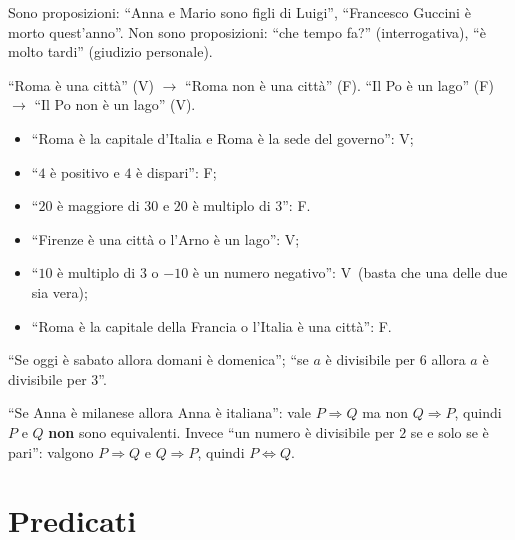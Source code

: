 \documentclass[11pt,a4paper]{article}
\newcommand{\V}{\textsf{V}}
\newcommand{\F}{\textsf{F}}
\begin{document}
\begin{esempio}
Sono proposizioni: ``Anna e Mario sono figli di Luigi'', ``Francesco Guccini è morto quest'anno''. Non sono proposizioni: ``che tempo fa?'' (interrogativa), ``è molto tardi'' (giudizio personale).
\end{esempio}

\begin{esempio}[Negazione]
``Roma è una città'' (\V) $\to$ ``Roma non è una città'' (\F).
``Il Po è un lago'' (\F) $\to$ ``Il Po non è un lago'' (\V).
\end{esempio}

\begin{esempio}[Congiunzione]
\begin{itemize}
    \item ``Roma è la capitale d'Italia e Roma è la sede del governo'': \V;
    \item ``$4$ è positivo e $4$ è dispari'': \F;
    \item ``$20$ è maggiore di $30$ e $20$ è multiplo di $3$'': \F.
\end{itemize}
\end{esempio}

\begin{esempio}[Disgiunzione]
\begin{itemize}
    \item ``Firenze è una città o l'Arno è un lago'': \V;
    \item ``$10$ è multiplo di $3$ o $-10$ è un numero negativo'': \V\ (basta che una delle due sia vera);
    \item ``Roma è la capitale della Francia o l'Italia è una città'': \F.
\end{itemize}
\end{esempio}

\begin{esempio}
``Se oggi è sabato allora domani è domenica''; ``se $a$ è divisibile per $6$ allora $a$ è divisibile per $3$''.

``Se Anna è milanese allora Anna è italiana'': vale $P \Rightarrow Q$ ma non $Q \Rightarrow P$, quindi $P$ e $Q$ \textbf{non} sono equivalenti. Invece ``un numero è divisibile per $2$ se e solo se è pari'': valgono $P \Rightarrow Q$ e $Q \Rightarrow P$, quindi $P \Leftrightarrow Q$.
\end{esempio}

\section{Predicati}
\end{document}
